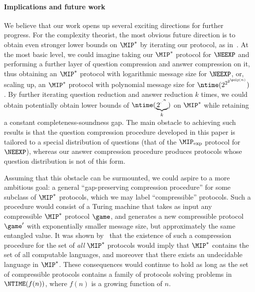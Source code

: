 \paragraph{Implications and future work}
We believe that our work opens up several exciting directions for
further progress. For the complexity theorist, the most obvious future
direction is to obtain even stronger lower bounds on $\MIP^*$ by
iterating our protocol, as in~\cite{FJVY19}. At the most basic level,
we could imagine taking our $\MIP^*$ protocol for $\NEEXP$ and
performing a further layer of question compression and answer compression
on it, thus obtaining an $\MIP^*$ protocol with
logarithmic message size for $\NEEXP$, or, scaling up, an $\MIP^*$
protocol with polynomial message size for
$\ntime(2^{2^{2^{\poly(n)}}})$. By further iterating question
reduction and answer reduction $k$ times, we could obtain potentially
obtain lower bounds of
$\ntime(\underbrace{2^{\cdot^{\cdot^{n}}}}_{k})$ on $\MIP^*$ while
retaining a constant completeness-soundness gap. The main obstacle to
achieving such results is that the question compression procedure
developed in this paper is tailored to a special distribution of
questions (that of the $\MIP_{\exp}$ protocol for $\NEEXP$), whereas our
answer compression procedure produces protocols whose question
distribution is not of this form.

Assuming that this obstacle can be surmounted, we could aspire to a
more ambitious goal: a general ``gap-preserving compression procedure'' for some
subclass of $\MIP^*$ protocols, which we may label ``compressible'' protocols. Such a procedure would consist of a
Turing  machine that takes as input any compressible $\MIP^*$
protocol $\game$, and generates a new compressible protocol $\game'$ with exponentially
smaller message size, but approximately the same entangled value. It
was shown by~\cite{FJVY19} that the existence of such a compression
procedure for the set of \emph{all} $\MIP^*$ protocols would imply
that $\MIP^*$ contains the set of all computable languages,
and moreover that there exists an undecidable language in
$\MIP^*$. These consequences would continue to hold as long as the set
of compressible protocols contains a family of protocols solving
problems in $\NTIME(f(n))$, where $f(n)$ is a growing function of
$n$.

